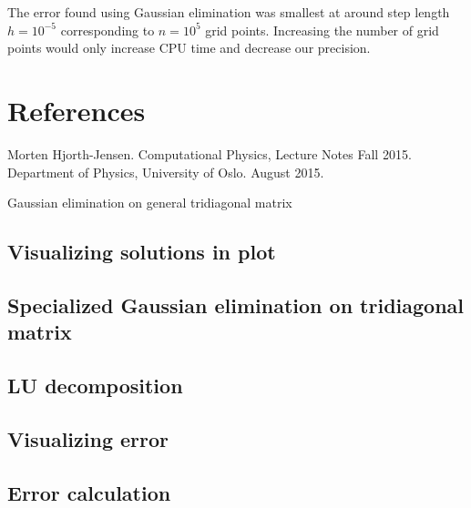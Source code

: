 \documentclass[norsk,a4paper,12pt]{article}
\begin{document}
The error found using Gaussian elimination was smallest at around step length $h=10^{-5}$ corresponding to $n=10^5$ grid points. Increasing the number of grid points would only increase CPU time and decrease our precision.

\section{References}
\begingroup
\renewcommand{\section}[2]{}
\begin{thebibliography}{}
  Morten Hjorth-Jensen.
  Computational Physics, Lecture Notes Fall 2015.
  Department of Physics, University of Oslo.
  August 2015.

\end{thebibliography}
\endgroup
\section{Code attachment}
\subsection{Gaussian elimination on general tridiagonal matrix}
\label{subsec:Gausgen}

\subsection{Visualizing solutions in plot}
\label{subsec:Visual}

\subsection{Specialized Gaussian elimination on tridiagonal matrix}
\label{subsec:Gausspes}

\subsection{LU decomposition}
\label{subsec:LUdecomp}

\subsection{Visualizing error}
\label{subsec:errorvis}

\subsection{Error calculation}
\label{subsec:errorcalc}

\end{document}
